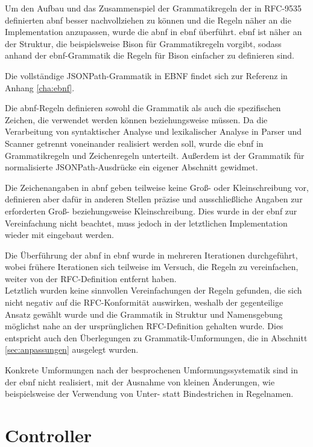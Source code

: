 \documentclass[oneside]{ausarbeitung}
\begin{document}
Um den Aufbau und das Zusammenspiel der Grammatikregeln der in RFC-9535 definierten \ac{abnf} besser nachvollziehen zu können und die Regeln näher an die Implementation anzupassen, wurde die \ac{abnf} in \ac{ebnf} überführt.
\ac{ebnf} ist näher an der Struktur, die beispielsweise Bison für Grammatikregeln vorgibt, sodass anhand der \ac{ebnf}-Grammatik die Regeln für Bison einfacher zu definieren sind.

Die vollständige JSONPath-Grammatik in EBNF findet sich zur Referenz in Anhang \ref{cha:ebnf}.

Die \ac{abnf}-Regeln definieren sowohl die Grammatik als auch die spezifischen Zeichen, die verwendet werden können beziehungsweise müssen. Da die Verarbeitung von syntaktischer Analyse und lexikalischer Analyse in Parser und Scanner getrennt voneinander realisiert werden soll, wurde die \ac{ebnf} in Grammatikregeln und Zeichenregeln unterteilt. Außerdem ist der Grammatik für normalisierte JSONPath-Ausdrücke ein eigener Abschnitt gewidmet.

Die Zeichenangaben in \ac{abnf} geben teilweise keine Groß- oder Kleinschreibung vor, definieren aber dafür in anderen Stellen präzise und ausschließliche Angaben zur erforderten Groß- beziehungsweise Kleinschreibung. Dies wurde in der \ac{ebnf} zur Vereinfachung nicht beachtet, muss jedoch in der letztlichen Implementation wieder mit eingebaut werden. 

Die Überführung der \ac{abnf} in \ac{ebnf} wurde in mehreren Iterationen durchgeführt, wobei frühere Iterationen sich teilweise im Versuch, die Regeln zu vereinfachen, weiter von der RFC-Definition entfernt haben. \\
Letztlich wurden keine sinnvollen Vereinfachungen der Regeln gefunden, die sich nicht negativ auf die RFC-Konformität auswirken, weshalb der gegenteilige Ansatz gewählt wurde und die Grammatik in Struktur und Namensgebung möglichst nahe an der ursprünglichen RFC-Definition gehalten wurde. Dies entspricht auch den Überlegungen zu Grammatik-Umformungen, die in Abschnitt \ref{sec:anpassungen} ausgelegt wurden.

Konkrete Umformungen nach der besprochenen Umformungssystematik sind in der \ac{ebnf} nicht realisiert, mit der Ausnahme von kleinen Änderungen, wie beispielsweise der Verwendung von Unter- statt Bindestrichen in Regelnamen. 





	
\section{Controller}
\end{document}
